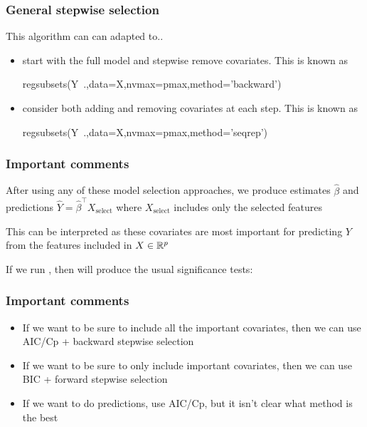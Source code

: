 \documentclass{beamer}
\begin{document}
\begin{frame}[fragile]
\frametitle{General stepwise selection}
This algorithm can can adapted to..
\vsp

\begin{itemize}
\item start with the full model and stepwise remove covariates.  This is known as 
\begin{blockcode}
regsubsets(Y~.,data=X,nvmax=pmax,method='backward')
\end{blockcode}
\item consider both adding and removing covariates at each step.  This is known as 
\begin{blockcode}
regsubsets(Y~.,data=X,nvmax=pmax,method='seqrep')
\end{blockcode}

\end{itemize}
\end{frame}

\begin{frame}[fragile]
\frametitle{Important comments}
After using any of these model selection approaches, we produce estimates $\hat\beta$ and predictions 
$\hat{Y} =\hat\beta^{\top} X_{\textrm{select}}$
where $X_{\textrm{select}}$ includes only the selected features

\vsp
This can be interpreted as these covariates are most important for predicting $Y$ from the features included in $X \in \mathbb{R}^p$


\vsp
If we run , then  will produce the usual significance tests: 


\end{frame}

\begin{frame}[fragile]
\frametitle{Important comments}
\begin{itemize}
\item If we want to be sure to include all the important covariates, then we can use AIC/Cp + backward stepwise selection
\item If we want to be sure to only include  important covariates, then we can use BIC + forward stepwise selection
\item If we want to do predictions, use AIC/Cp, but it isn't clear what method is the best
\end{itemize}
\end{frame}
\end{document}
